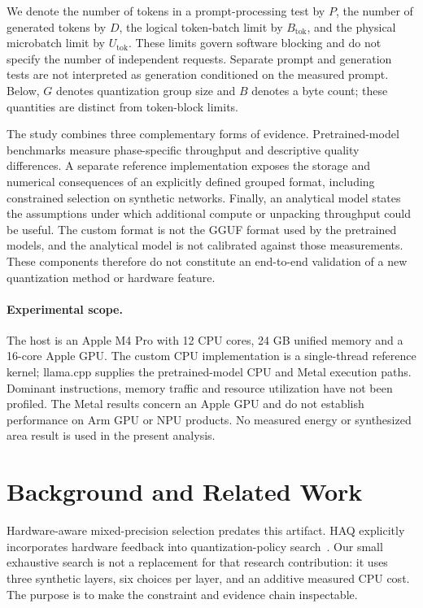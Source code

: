 \documentclass[11pt]{article}
\begin{document}
We denote the number of tokens in a prompt-processing test by $P$, the number of
generated tokens by $D$, the logical token-batch limit by $B_{\mathrm{tok}}$, and
the physical microbatch limit by $U_{\mathrm{tok}}$. These limits govern software
blocking and do not specify the number of independent requests. Separate prompt
and generation tests are not interpreted as generation conditioned on the measured
prompt. Below, $G$ denotes quantization group size and $B$ denotes a byte count;
these quantities are distinct from token-block limits.

The study combines three complementary forms of evidence. Pretrained-model
benchmarks measure phase-specific throughput and descriptive quality differences.
A separate reference implementation exposes the storage and numerical consequences
of an explicitly defined grouped format, including constrained selection on
synthetic networks. Finally, an analytical model states the assumptions under which
additional compute or unpacking throughput could be useful. The custom format is
not the GGUF format used by the pretrained models, and the analytical model is not
calibrated against those measurements. These components therefore do not constitute
an end-to-end validation of a new quantization method or hardware feature.

\paragraph{Experimental scope.}
The host is an Apple M4 Pro with 12 CPU cores, 24 GB unified memory and a 16-core
Apple GPU. The custom CPU implementation is a single-thread reference kernel;
llama.cpp supplies the pretrained-model CPU and Metal execution paths. Dominant
instructions, memory traffic and resource utilization have not been profiled.
The Metal results concern an Apple GPU and do not establish performance on Arm
GPU or NPU products. No measured energy or synthesized area result is used in the
present analysis.

\section{Background and Related Work}
Hardware-aware mixed-precision selection predates this artifact. HAQ explicitly
incorporates hardware feedback into quantization-policy search~\cite{haq}. Our
small exhaustive search is not a replacement for that research contribution: it
uses three synthetic layers, six choices per layer, and an additive measured CPU
cost. The purpose is to make the constraint and evidence chain inspectable.
\end{document}
